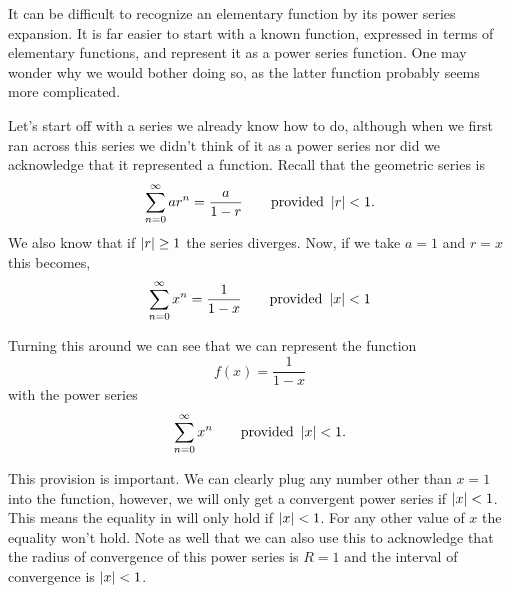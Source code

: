 It can be difficult to recognize an elementary function by its power series expansion. It is far easier to start with a known function, expressed in terms of elementary functions, and represent it as a power series function. One may wonder why we would bother doing so, as the latter function probably seems more complicated.


Let's start off with a series we already know how to do, although when we first ran across this series we didn't think of it as a power series nor did we acknowledge that it represented a function. Recall that the geometric series is
\[\sum_{n=0}^\infty ar^n = \frac a{1-r} \qquad \text{provided }\left\lvert r \right\rvert<1.\]
We also know that if $\left\lvert r \right\rvert\geq 1$ the series diverges. Now, if we take $a=1$ and $r=x$ this becomes,
\begin{equation}
\label{eq_power_eq}
\sum_{n=0}^\infty x^n=\frac1{1-x}\qquad\text{provided }\left\lvert x \right\rvert<1
\end{equation}

Turning this around we can see that we can represent the function
\begin{equation}
\label{eq_power_func}
f(x) = \frac1{1-x}
\end{equation}
with the power series
\begin{equation}
\label{eq_power_series}
\sum_{n=0}^{\infty}x^n \qquad \text{provided }\left\lvert x \right\rvert<1.
\end{equation}

This provision is important.  We can clearly plug any number other than $x=1$ into the function, however, we will only get a convergent power series if $\left\lvert x \right\rvert<1$.  This means the equality in  will only hold if $\left\lvert x \right\rvert<1$.  For any other value of $x$ the equality won't hold.  Note as well that we can also use this to acknowledge that the radius of convergence of this power series is $R=1$ and the interval of convergence is $\left\lvert x \right\rvert<1$.

